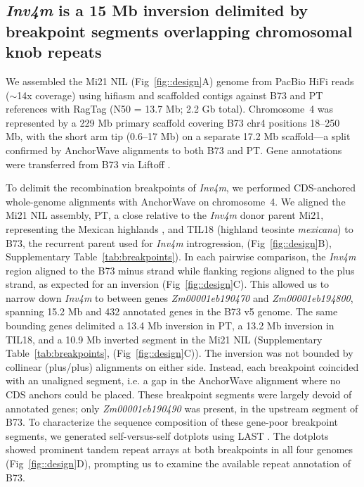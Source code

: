 \documentclass[9pt,twocolumn,twoside]{rilabRxiv}
\newcommand{\mex}{\textit{mexicana}\xspace}
\newcommand{\invfour}{\textit{Inv4m}\xspace}
\begin{document}
\subsection{\invfour is a 15 Mb inversion delimited by breakpoint segments overlapping chromosomal knob repeats}
We assembled the Mi21 NIL (Fig~\ref{fig::design}A) genome from PacBio HiFi reads ($\sim$14x coverage) using hifiasm \citep{cheng2021} and scaffolded contigs against B73 and PT references with RagTag \citep{alonge2022} (N50 = 13.7 Mb; 2.2 Gb total).
Chromosome~4 was represented by a 229 Mb primary scaffold covering B73 chr4 positions 18--250 Mb, with the short arm tip (0.6--17 Mb) on a separate 17.2 Mb scaffold---a split confirmed by AnchorWave \citep{song2022} alignments to both B73 and PT.
Gene annotations were transferred from B73 via Liftoff \citep{shumate2021}.

To delimit the recombination breakpoints of \invfour, we performed CDS-anchored whole-genome alignments with AnchorWave \citep{song2022} on chromosome~4.
We aligned the Mi21 NIL assembly, PT, a close relative to the \invfour donor parent Mi21, representing the Mexican highlands \citep{perez-limon2022, Vielle-Calzada2009-fp},  and TIL18 (highland teosinte \mex) to B73, the recurrent parent used for \invfour introgression, (Fig~\ref{fig::design}B), Supplementary Table~\ref{tab:breakpoints}).
In each pairwise comparison, the \invfour region aligned to the B73 minus strand while flanking regions aligned to the plus strand, as expected for an inversion (Fig~\ref{fig::design}C).
This allowed us to narrow down \invfour to between genes \textit{Zm00001eb190470} and \textit{Zm00001eb194800}, spanning 15.2 Mb and 432 annotated genes in the B73 v5 genome.
The same bounding genes delimited a 13.4 Mb inversion in PT, a 13.2 Mb inversion in TIL18, and a 10.9 Mb inverted segment in the Mi21 NIL (Supplementary Table~\ref{tab:breakpoints}, (Fig~\ref{fig::design}C)).
The inversion was not bounded by collinear (plus/plus) alignments on either side.
Instead, each breakpoint coincided with an unaligned segment, i.e. a gap in the AnchorWave alignment where no CDS anchors could be placed.
These breakpoint segments were largely devoid of annotated genes; only \textit{Zm00001eb190490} was present, in the upstream segment of B73.
To characterize the sequence composition of these gene-poor breakpoint segments, we generated self-versus-self dotplots using LAST \citep{kielbasa2011}.
The dotplots showed prominent tandem repeat arrays at both breakpoints in all four genomes (Fig~\ref{fig::design}D), prompting us to examine the available repeat annotation of B73.
\end{document}
